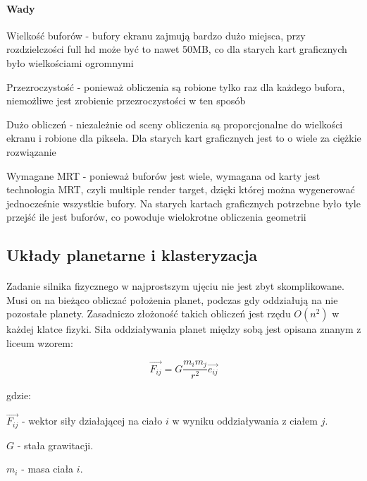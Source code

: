 \paragraph{Wady}

\begin{description}
\item{Wielkość buforów} - bufory ekranu zajmują bardzo dużo miejsca, przy rozdzielczości full hd może być to nawet 50MB, co dla starych kart graficznych było wielkościami ogromnymi
\item{Przezroczystość} - ponieważ obliczenia są robione tylko raz dla każdego bufora, niemożliwe jest zrobienie przezroczystości w ten sposób
\item{Dużo obliczeń} - niezależnie od sceny obliczenia są proporcjonalne do wielkości ekranu i robione dla piksela. Dla starych kart graficznych jest to o wiele za ciężkie rozwiązanie
\item{Wymagane MRT} - ponieważ buforów jest wiele, wymagana od karty jest technologia MRT, czyli multiple render target, dzięki której można wygenerować jednocześnie wszystkie bufory. Na starych kartach graficznych potrzebne było tyle przejść ile jest buforów, co powoduje wielokrotne obliczenia geometrii
\end{description}

\subsection{Układy planetarne i klasteryzacja}\label{sub:uklady planetarne}

\paragraph{}
Zadanie silnika fizycznego w najprostszym ujęciu nie jest zbyt skomplikowane. Musi on na bieżąco obliczać położenia planet, podczas gdy oddziałują na nie pozostałe planety. Zasadniczo złożoność takich obliczeń jest rzędu \ensuremath{O(n^2)} w każdej klatce fizyki. Siła oddziaływania planet między sobą jest opisana znanym z liceum wzorem:

		$$ \overrightarrow{F_{ij}} = G\frac{m_i m_j}{r^2}\overrightarrow{e_{ij}}  $$

gdzie: 

$ \overrightarrow{F_{ij}} $ - wektor siły działającej na ciało $i$ w wyniku oddziaływania z ciałem $j$. 

$ G $ - stała grawitacji. 
 
$ m_i $ - masa ciała $i$. 

